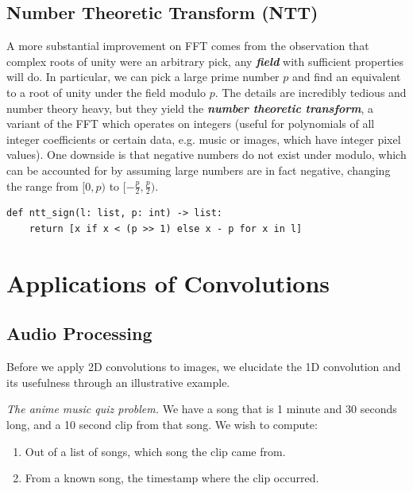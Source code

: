 \documentclass[11pt, oneside]{article}
\newcommand{\emphasis}[1]{\textbf{\textit{#1}}}
\theoremstyle{plain}
\theoremstyle{definition}
\begin{document}
\subsection{Number Theoretic Transform (NTT)}
A more substantial improvement on FFT comes from the observation that complex
roots of unity were an arbitrary pick, any \emphasis{field} with sufficient
properties will do. In particular, we can pick a large prime number \( p \) 
and find an equivalent to a root of unity under the field modulo \( p \).
The details are incredibly tedious and number theory heavy, but they yield
the \emphasis{number theoretic transform}, a variant of the FFT which operates
on integers (useful for polynomials of all integer coefficients or certain
data, e.g. music or images, which have integer pixel values).
One downside is that negative numbers do not exist under modulo, which can
be accounted for by assuming large numbers are in fact negative,
changing the range from \( [0, p) \) to \( [-\frac{p}{2}, \frac{p}{2}) \).

\begin{verbatim}
def ntt_sign(l: list, p: int) -> list:
    return [x if x < (p >> 1) else x - p for x in l]
\end{verbatim}

\section{Applications of Convolutions}
\subsection{Audio Processing}
Before we apply 2D convolutions to images, we elucidate the 1D convolution
and its usefulness through an illustrative example.
\begin{displayquote}
\textit{The anime music quiz problem.} We have a song that is 1 minute and
30 seconds long, and a 10 second clip from that song. We wish to compute:
\begin{enumerate}
  \item Out of a list of songs, which song the clip came from.
  \item From a known song, the timestamp where the clip occurred.
\end{enumerate}
\end{displayquote}
\end{document}
